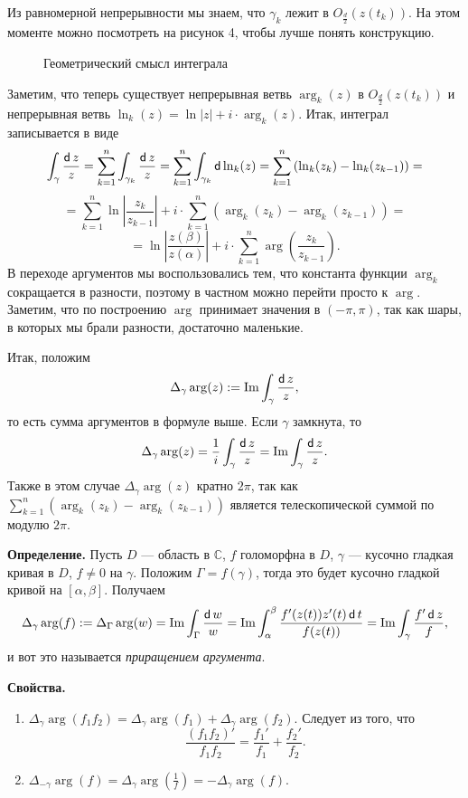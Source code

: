 Из равномерной непрерывности мы знаем, что $\gamma_k$ лежит в $O_{\frac{d}{2}}(z(t_k))$.
На этом моменте можно посмотреть на рисунок 4, чтобы лучше понять конструкцию.

\begin{figure}[ht]
    \centering
    \caption{Геометрический смысл интеграла}
\end{figure}

Заметим, что теперь существует непрерывная ветвь $\arg_k(z)$ в $O_{\frac{d}{2}}(z(t_k))$ и непрерывная ветвь $\ln_k(z) = \ln|z| + i \cdot \arg_k(z)$.
Итак, интеграл записывается в виде
\[
    \int_\gamma \frac{\operatorname{\mathsf d} z}{z} = \sum_{k=1}^{n} \int_{\gamma_k} \frac{\operatorname{\mathsf d} z}{z} = \sum_{k=1}^{n} \int_{\gamma_k} \operatorname{\mathsf d} \ln_k(z) = \sum_{k=1}^{n} \left( \ln_k(z_k) - \ln_k(z_{k-1}) \right) =
\]
\[
    = \sum_{k=1}^{n} \ln \left| \frac{z_k}{z_{k-1}} \right| + i \cdot \sum_{k=1}^{n} (\arg_k(z_k) - \arg_k(z_{k-1})) =
\]
\[
    = \ln \left| \frac{z(\beta)}{z(\alpha)} \right| + i \cdot \sum_{k=1}^{n} \arg \left( \frac{z_k}{z_{k-1}} \right).
\]
В переходе аргументов мы воспользовались тем, что константа функции $\arg_k$ сокращается в разности, поэтому в частном можно перейти просто к $\arg$.
Заметим, что по построению $\arg$ принимает значения в $(-\pi, \pi)$, так как шары, в которых мы брали разности, достаточно маленькие.

Итак, положим 
\[
    \Delta_\gamma \arg(z) := \operatorname{Im} \int_\gamma \frac{\operatorname{\mathsf d} z}{z},
\]
то есть сумма аргументов в формуле выше.
Если $\gamma$ замкнута, то
\[
    \Delta_\gamma \arg(z) = \frac{1}{i} \int_\gamma \frac{\operatorname{\mathsf d} z}{z} = \operatorname{Im} \int_\gamma \frac{\operatorname{\mathsf d} z}{z}.
\]
Также в этом случае $\Delta_\gamma \arg(z)$ кратно $2\pi$, так как $\sum_{k=1}^{n} (\arg_k(z_k) - \arg_k(z_{k-1}))$ является телескопической суммой по модулю $2\pi$.

\textbf{Определение.} Пусть $D$ --- область в $\mathbb C$, $f$ голоморфна в $D$, $\gamma$ --- кусочно гладкая кривая в $D$, $f \ne 0$ на $\gamma$.
Положим $\Gamma = f(\gamma)$, тогда это будет кусочно гладкой кривой на $[\alpha, \beta]$.
Получаем
\[
    \Delta_\gamma \arg(f) := \Delta_\Gamma \arg(w) = \operatorname{Im} \int_\Gamma \frac{\operatorname{\mathsf d} w}{w} = \operatorname{Im} \int_\alpha^\beta \frac{f'(z(t)) z'(t) \operatorname{\mathsf d} t}{f(z(t))} = \operatorname{Im} \int_\gamma \frac{f' \operatorname{\mathsf d} z}{f},
\]
и вот это называется \textit{приращением аргумента}.

\textbf{Свойства.}
\begin{enumerate}
    \item $\Delta_\gamma \arg(f_1 f_2) = \Delta_\gamma \arg(f_1) + \Delta_\gamma \arg(f_2)$.
        Следует из того, что
        \[
            \frac{(f_1 f_2)'}{f_1f_2} = \frac{f_1'}{f_1} + \frac{f_2'}{f_2}.
        \]

    \item $\Delta_{-\gamma} \arg(f) = \Delta_\gamma \arg \left( \frac{1}{f} \right) = -\Delta_\gamma \arg(f)$.
\end{enumerate}

